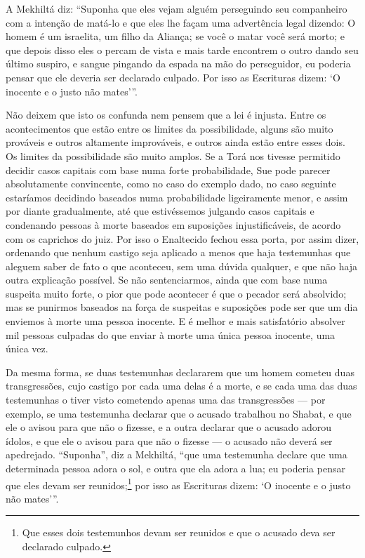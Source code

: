 A Mekhiltá diz: ``Suponha que eles vejam alguém perseguindo seu
companheiro com a intenção de matá-lo e que eles lhe façam uma
advertência legal dizendo: O homem é um israelita, um filho da Aliança;
se você o matar você será morto; e que depois disso eles o percam de
vista e mais tarde encontrem o outro dando seu último suspiro, e sangue
pingando da espada na mão do perseguidor, eu poderia pensar que ele
deveria ser declarado culpado. Por isso as Escrituras dizem: `O inocente
e o justo não mates'''.

Não deixem que isto os confunda nem pensem que a lei é injusta. Entre os
acontecimentos que estão entre os limites da possibilidade, alguns são
muito prováveis e outros altamente improváveis, e outros ainda estão
entre esses dois. Os limites da possibilidade são muito amplos. Se a
Torá nos tivesse permitido decidir casos capitais com base numa forte
probabilidade, Sue pode parecer absolutamente convincente, como no caso
do exemplo dado, no caso seguinte estaríamos decidindo baseados numa
probabilidade ligeiramente menor, e assim por diante gradualmente, até
que estivéssemos julgando casos capitais e condenando pessoas à morte
baseados em suposições injustificáveis, de acordo com os caprichos do
juiz. Por isso o Enaltecido fechou essa porta, por assim dizer,
ordenando que nenhum castigo seja aplicado a menos que haja testemunhas
que aleguem saber de fato o que aconteceu, sem uma dúvida qualquer, e
que não haja outra explicação possível. Se não sentenciarmos, ainda que
com base numa suspeita muito forte, o pior que pode acontecer é que o
pecador será absolvido; mas se punirmos baseados na força de suspeitas e
suposições pode ser que um dia enviemos à morte uma pessoa inocente. E é
melhor e mais satisfatório absolver mil pessoas culpadas do que enviar à
morte uma única pessoa inocente, uma única vez.

Da mesma forma, se duas testemunhas declararem que um homem cometeu duas
transgressões, cujo castigo por cada uma delas é a morte, e se cada uma
das duas testemunhas o tiver visto cometendo apenas uma das
transgressões --- por exemplo, se uma testemunha declarar que o acusado
trabalhou no Shabat, e que ele o avisou para que não o fizesse, e a
outra declarar que o acusado adorou ídolos, e que ele o avisou para que
não o fizesse --- o acusado não deverá ser apedrejado. ``Suponha'', diz
a Mekhiltá, ``que uma testemunha declare que uma determinada pessoa
adora o sol, e outra que ela adora a lua;
eu poderia pensar que eles devam ser reunidos;\footnote{Que esses dois testemunhos devam ser reunidos e que o acusado deva ser declarado culpado.} por
isso as Escrituras dizem: `O inocente e o justo não mates'''.

